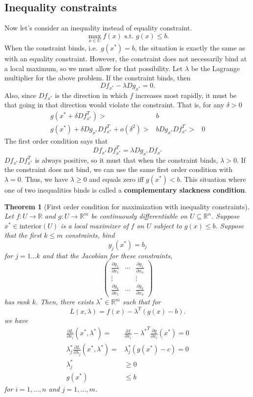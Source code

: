\documentclass[12pt,reqno]{amsart}
\newtheorem{theorem}{Theorem}[section]
\theoremstyle{definition}
\def\R{\mathbb{R}}
\renewcommand{\to}{{\rightarrow}}
\begin{document}
\subsection{Inequality constraints}

Now let's consider an inequality instead of equality constraint. 
\[ \max_{x \in U} f(x) \text{ s.t. } g(x) \leq b. \]
When the constraint binds, i.e.\ $g(x^*) = b$, the situation is
exactly the same as with an equality constraint. However, the
constraint does not necessarily bind at a local maximum, so we must allow
for that possibility.  Let $\lambda$ be the Lagrange multiplier for
the above problem. If the constraint binds, then
\[ Df_{x^*} - \lambda D g_{x^*} = 0. \]
Also, since $Df_{x^*}$ is the direction in which $f$ increases most
rapidly, it must be that going in that direction would violate the
constraint. That is, for any $\delta > 0$
\begin{align*} 
  g(x^* + \delta Df_{x^*}^T) > & b \\ 
  g(x^*) + \delta Dg_{x^*} Df_{x^*}^T + o(\delta^2) > & b
  Dg_{x^*} Df_{x^*}^T > & 0
\end{align*}
The first order condition says that 
\[ Df_{x^*} Df_{x^*}^T =  \lambda D g_{x^*} D f_{x^*} \]
$Df_{x^*} Df_{x^*}^T$ is always positive, so it must that when the
constraint binds, $\lambda > 0$. If the constraint does not bind, we
can use the same first order condition with $\lambda=0$. Thus, we have
$\lambda \geq 0$ and equals zero iff $g(x^*) < b$. This situation
where one of two inequalities binds is called a \textbf{complementary
  slackness condition}. 
\begin{theorem}[First order condition for maximization with inequality constraints] \label{thm:icon}
  Let $f:U \to \R$ and $g: U \to \R^m$ be continuously
  differentiable on $U \subseteq \R^n$. Suppose $x^* \in
  \mathrm{interior}(U)$ is a local maximizer of $f$ on $U$ subject to 
  $g(x) \leq b$. Suppose that the first $k \leq m$ constraints, bind
  \[ g_j(x^*) = b_j \]
  for $j = 1 ... k$ and that the Jacobian for these constraints, 
  \[ \begin{pmatrix} 
    \frac{\partial g_1}{\partial x_1} &  \cdots &\frac{\partial g_1}{\partial x_n}  \\
    \vdots & & \vdots \\
    \frac{\partial g_k}{\partial x_1} &  \cdots &\frac{\partial g_k}{\partial x_n}  
  \end{pmatrix}
  \]
  has rank $k$. Then, there exists
  $\lambda^* \in \R^m$ such that for
  \[ L(x,\lambda) = f(x) - \lambda^T (g(x) - b). \]
  we have
  \begin{align*}
    \frac{\partial L}{\partial x_i}(x^*,\lambda^*) = & \frac{\partial
      f}{\partial x_i} - {\lambda^*}^T \frac{\partial g}{\partial
      x_i}(x^*) = 0 \\
    \lambda_j^* \frac{\partial L}{\partial \lambda_j}(x^*,\lambda^*) =
    & \lambda_j^* \left(g(x^*) - c \right)= 0 \\
    \lambda_j^* & \geq 0 \\
    g(x^*) & \leq b
  \end{align*}
  for $i = 1, ..., n$ and $j=1,...,m$.
\end{theorem}
\end{document}

